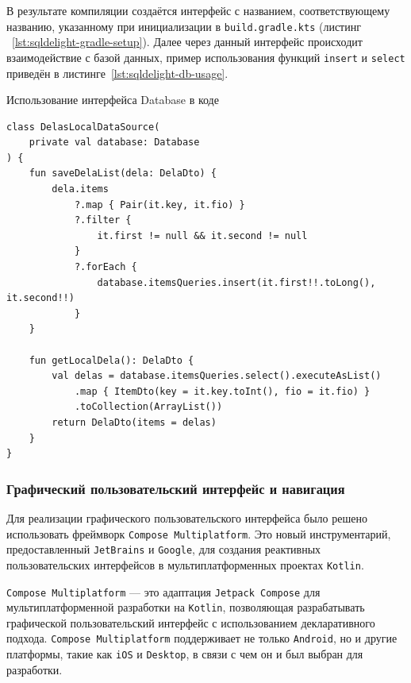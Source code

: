 \documentclass[14pt, russian]{scrartcl}
\begin{document}
В результате компиляции создаётся интерфейс с названием, соответствующему названию, указанному при инициализации в \texttt{build.gradle.kts} (листинг ~\ref{lst:sqldelight-gradle-setup}). Далее через данный интерфейс происходит взаимодействие с базой данных, пример использования функций \texttt{insert} и \texttt{select} приведён в листинге~\ref{lst:sqldelight-db-usage}.

\begin{listing}[!htb]
\caption{Использование интерфейса Database в коде}
\label{lst:sqldelight-db-usage}
\begin{verbatim}
class DelasLocalDataSource(
    private val database: Database
) {
    fun saveDelaList(dela: DelaDto) {
        dela.items
            ?.map { Pair(it.key, it.fio) }
            ?.filter {
                it.first != null && it.second != null
            }
            ?.forEach {
                database.itemsQueries.insert(it.first!!.toLong(), it.second!!)
            }
    }

    fun getLocalDela(): DelaDto {
        val delas = database.itemsQueries.select().executeAsList()
            .map { ItemDto(key = it.key.toInt(), fio = it.fio) }
            .toCollection(ArrayList())
        return DelaDto(items = delas)
    }
}
\end{verbatim}
\end{listing}

\subsubsection{Графический пользовательский интерфейс и навигация}\label{sect:compose-mp}

Для реализации графического пользовательского интерфейса было решено использовать фреймворк \texttt{Compose Multiplatform}. Это новый инструментарий, предоставленный \texttt{JetBrains} и \texttt{Google}, для создания реактивных пользовательских интерфейсов в мультиплатформенных проектах \texttt{Kotlin}.

\texttt{Compose Multiplatform} –-- это адаптация \texttt{Jetpack Compose} для мультиплатформенной разработки на \texttt{Kotlin}, позволяющая разрабатывать графической пользовательский интерфейс с использованием декларативного подхода. \texttt{Compose Multiplatform} поддерживает не только \texttt{Android}, но и другие платформы, такие как \texttt{iOS} и \texttt{Desktop}, в связи с чем он и был выбран для разработки.
\end{document}
